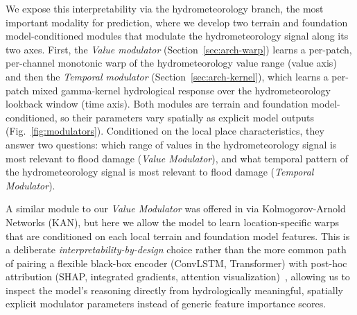 We expose this interpretability via the hydrometeorology branch, the most important modality for prediction, where we develop two terrain and foundation model-conditioned modules that modulate the hydrometeorology signal along its two axes.
First, the \emph{Value modulator} (Section~\ref{sec:arch-warp})  learns a per-patch, per-channel monotonic warp of the hydrometeorology value range (value axis) and then the \emph{Temporal modulator} (Section~\ref{sec:arch-kernel}), which learns a per-patch mixed gamma-kernel hydrological response over the hydrometeorology lookback window (time axis).
%
Both modules are terrain and foundation model-conditioned, so their parameters vary spatially as explicit model outputs (Fig.~\ref{fig:modulators}).
%
Conditioned on the local place characteristics, they answer two questions: which range of values in the hydrometeorology signal is most relevant to flood damage (\emph{Value Modulator}), and what temporal pattern of the hydrometeorology signal is most relevant to flood damage (\emph{Temporal Modulator}).

A similar module to our \emph{Value Modulator} was offered in \cite{taghizadeh_interpretable_2024} via Kolmogorov-Arnold Networks (KAN), but here we allow the model to learn location-specific warps that are conditioned on each local terrain and foundation model features.
%
This is a deliberate \emph{interpretability-by-design} choice rather than the more common path of pairing a flexible black-box encoder (ConvLSTM, Transformer) with post-hoc attribution (SHAP, integrated gradients, attention visualization)~\cite{rudin_stop_2019}, allowing us to inspect the model's reasoning directly from hydrologically meaningful, spatially explicit modulator parameters instead of generic feature importance scores.

